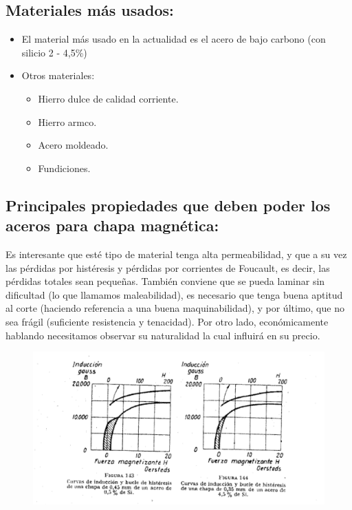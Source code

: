 \documentclass[12pt,a4paper]{article}
\begin{document}
\subsection{Materiales más usados:}
\begin{itemize}
    \item El material más usado en la actualidad es el acero de bajo carbono (con silicio 2 - 4,5\%)
    \item Otros materiales: 
    \begin{itemize}
        \item Hierro dulce de calidad corriente.
        \item Hierro armco.
        \item Acero moldeado.
        \item Fundiciones.
    \end{itemize}
\end{itemize}

\subsection{Principales propiedades que deben poder los aceros para chapa magnética:}

Es interesante que esté tipo de material tenga alta permeabilidad, y que a su vez las pérdidas por histéresis y pérdidas por corrientes de Foucault, es decir, las pérdidas totales sean pequeñas. También conviene que se pueda laminar sin dificultad (lo que llamamos maleabilidad), es necesario que tenga buena aptitud al corte (haciendo referencia a una buena maquinabilidad), y por último, que no sea frágil (suficiente resistencia y tenacidad). Por otro lado, económicamente hablando necesitamos observar su naturalidad la cual influirá en su precio.

\begin{figure}[H]    
    \centering         
    \includegraphics[width=1\textwidth]{IMAGENES LATEX/2.png}
\end{figure}
\end{document}
